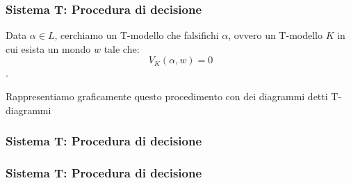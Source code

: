 \documentclass[notheorem,aspectratio=169]{beamer}
\begin{document}
\begin{frame}
\frametitle{Sistema T: Procedura di decisione}
Data $\alpha \in L$, cerchiamo un T-modello che falsifichi $\alpha$, ovvero un T-modello $K$
in cui esista un mondo $w$ tale che: $$V_K(\alpha, w) = 0$$.

Rappresentiamo graficamente questo procedimento con dei diagrammi detti T-diagrammi
\end{frame}


\begin{frame}
\frametitle{Sistema T: Procedura di decisione}
\begin{center}
\end{center}
\end{frame}

\begin{frame}
\frametitle{Sistema T: Procedura di decisione}
\begin{center}
\end{center}
\end{frame}
\end{document}
